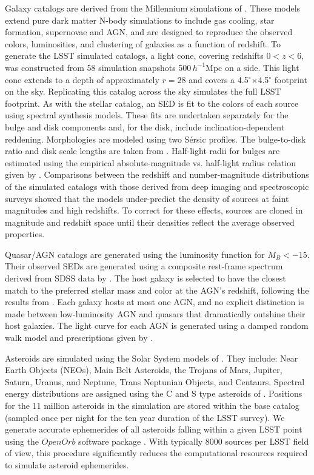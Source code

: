 Galaxy catalogs are derived from the Millennium simulations of
\citet{2006MNRAS.366..499D}.  These models extend pure dark matter N-body
simulations to include gas cooling, star formation, supernovae and
AGN, and are designed to reproduce the observed colors, luminosities,
and clustering of galaxies as a function of redshift. To generate the
LSST simulated catalogs, a light cone, covering redshifts $0<z<6$, was
constructed from 58 simulation snapshots 500\,$h^{-1}$Mpc on a side. This
light cone extends to a depth of approximately $r=28$ and covers a
4.5$^\circ$$\times$4.5$^\circ$ footprint on the sky. Replicating this
catalog across the sky simulates the full LSST footprint. As with the
stellar catalog, an SED is fit to the colors of each source using
\citet{2003MNRAS.344.1000B} spectral synthesis models. These fits are
undertaken separately for the bulge and disk components and, for the
disk, include inclination-dependent reddening. Morphologies are
modeled using two S\'ersic profiles. The bulge-to-disk ratio and disk
scale lengths are taken from \citet{2006MNRAS.366..499D}. Half-light radii
for bulges are estimated using the empirical absolute-magnitude
vs. half-light radius relation given by \citet{2009MNRAS.397.1254G}.
Comparisons between the redshift and number-magnitude
distributions of the simulated catalogs with those derived from deep
imaging and spectroscopic surveys showed that the \citet{2006MNRAS.366..499D}
models under-predict the density of sources at faint magnitudes
and high redshifts. To correct for these effects, sources are cloned
in magnitude and redshift space until their densities reflect the
average observed properties.

Quasar/AGN catalogs are generated using the \citet{2007A&A...472..443B}
luminosity function for $M_B < -15$.
Their observed SEDs are generated using a composite
rest-frame spectrum derived from SDSS data by \citet{2001AJ....122..549V}.
The host galaxy is selected to have the closest match to
the preferred stellar mass and color at the AGN's redshift, following
the results from \citet{2010ApJ...720..368X}.  Each galaxy hosts at most one
AGN, and no explicit distinction is made between low-luminosity AGN and
quasars that dramatically outshine their host galaxies. The light
curve for each AGN is generated using a damped random walk model and
prescriptions given by \citet{2010ApJ...721.1014M}.

Asteroids are simulated using the Solar System models of \citet{2007AAS...211.4721G}.
They include: Near Earth Objects (NEOs), Main Belt
Asteroids, the Trojans of Mars, Jupiter, Saturn, Uranus, and Neptune,
Trans Neptunian Objects, and Centaurs. Spectral energy distributions
are assigned using the C and S type asteroids of \citet{2009Icar..202..160D}.
Positions for the 11 million asteroids in the simulation
are stored within the base catalog (sampled once per night for the ten
year duration of the LSST survey). We generate
accurate ephemerides of all asteroids falling within a given LSST
point using the $OpenOrb$ software package \citep{2009M&PS...44.1853G}.
With typically 8000 sources per LSST field of view, this
procedure significantly reduces the computational resources
required to simulate asteroid ephemerides.



